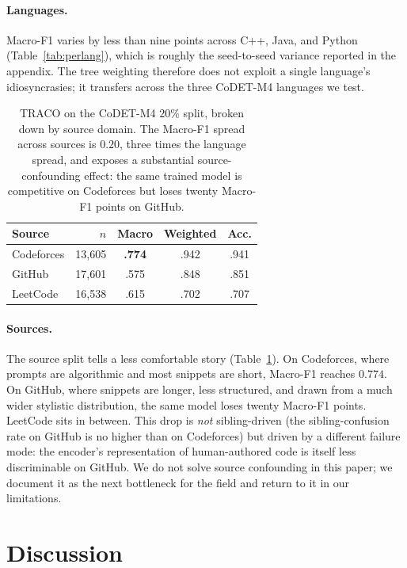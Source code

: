 ﻿\documentclass[11pt]{article}
\newcommand{\method}{\textsc{TRACO}\xspace}
\begin{document}
\paragraph{Languages.} Macro-F1 varies by less than nine points
across C++, Java, and Python (Table~\ref{tab:perlang}), which is
roughly the seed-to-seed variance reported in the appendix. The
tree weighting therefore does not exploit a single language's
idiosyncrasies; it transfers across the three CoDET-M4 languages we
test.

\begin{table}[ht]
\centering\footnotesize
\setlength{\tabcolsep}{4pt}
\begin{tabular}{@{}l rccc@{}}
\toprule
\textbf{Source} & $n$ & Macro & Weighted & Acc. \\
\midrule
Codeforces & 13{,}605 & \textbf{.774} & .942 & .941 \\
GitHub     & 17{,}601 & .575 & .848 & .851 \\
LeetCode   & 16{,}538 & .615 & .702 & .707 \\
\bottomrule
\end{tabular}
\caption{\label{tab:persrc}
\method on the CoDET-M4 $20\%$ split, broken down by source domain.
The Macro-F1 spread across sources is $0.20$, three times the
language spread, and exposes a substantial source-confounding
effect: the same trained model is competitive on Codeforces but
loses twenty Macro-F1 points on GitHub.}
\end{table}

\paragraph{Sources.} The source split tells a less comfortable
story (Table~\ref{tab:persrc}). On Codeforces, where prompts are
algorithmic and most snippets are short, Macro-F1 reaches $0.774$.
On GitHub, where snippets are longer, less structured, and drawn
from a much wider stylistic distribution, the same model loses
twenty Macro-F1 points. LeetCode sits in between. This drop is
\emph{not} sibling-driven (the sibling-confusion rate on GitHub is
no higher than on Codeforces) but driven by a different failure
mode: the encoder's representation of human-authored code is itself
less discriminable on GitHub. We do not solve source confounding in
this paper; we document it as the next bottleneck for the field and
return to it in our limitations.

\section{Discussion}
\label{sec:discussion}
\end{document}
